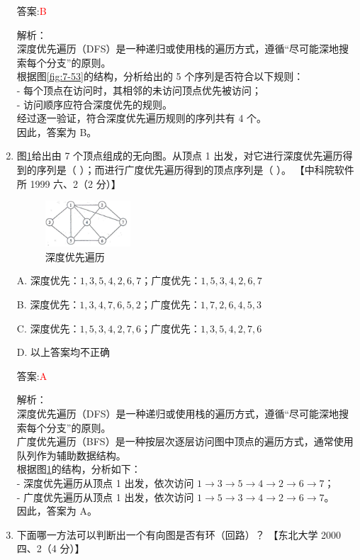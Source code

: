 \documentclass[lang=cn,newtx,10pt,scheme=chinese]{../../../elegantbook}
\begin{document}
\begin{enumerate}
        答案:\textcolor{red}{B}

        解析：\\
        深度优先遍历（DFS）是一种递归或使用栈的遍历方式，遵循“尽可能深地搜索每个分支”的原则。\\
        根据图\ref{fig:7-53}的结构，分析给出的 5 个序列是否符合以下规则：\\
        - 每个顶点在访问时，其相邻的未访问顶点优先被访问；\\
        - 访问顺序应符合深度优先的规则。\\
        经过逐一验证，符合深度优先遍历规则的序列共有 4 个。\\
        因此，答案为 B。
        \item 图\ref{fig:7-54}给出由 7 个顶点组成的无向图。从顶点 1 出发，对它进行深度优先遍历得到的序列是（ ）；而进行广度优先遍历得到的顶点序列是（ ）。  
        【中科院软件所 1999 六、2（2 分）】  

        \begin{figure}[h!]
            \centering
            \includegraphics[width=0.3\textwidth]{../../figure/exercisePicPDF/chapter7/7-54.pdf}
            \caption{深度优先遍历}
            \label{fig:7-54}
    \end{figure}
        A. 深度优先：$1, 3, 5, 4, 2, 6, 7$；广度优先：$1, 5, 3, 4, 2, 6, 7$  

        B. 深度优先：$1, 3, 4, 7, 6, 5, 2$；广度优先：$1, 7, 2, 6, 4, 5, 3$  

        C. 深度优先：$1, 5, 3, 4, 2, 7, 6$；广度优先：$1, 3, 5, 4, 2, 7, 6$  

        D. 以上答案均不正确  
    
        答案:\textcolor{red}{A}

        解析：\\
        深度优先遍历（DFS）是一种递归或使用栈的遍历方式，遵循“尽可能深地搜索每个分支”的原则。\\
        广度优先遍历（BFS）是一种按层次逐层访问图中顶点的遍历方式，通常使用队列作为辅助数据结构。\\
        根据图\ref{fig:7-54}的结构，分析如下：\\
        - 深度优先遍历从顶点 1 出发，依次访问 $1 \to 3 \to 5 \to 4 \to 2 \to 6 \to 7$；\\
        - 广度优先遍历从顶点 1 出发，依次访问 $1 \to 5 \to 3 \to 4 \to 2 \to 6 \to 7$。\\
        因此，答案为 A。
        \item 下面哪一方法可以判断出一个有向图是否有环（回路）？  
    【东北大学 2000 四、2（4 分）】


\end{enumerate}
\end{document}
